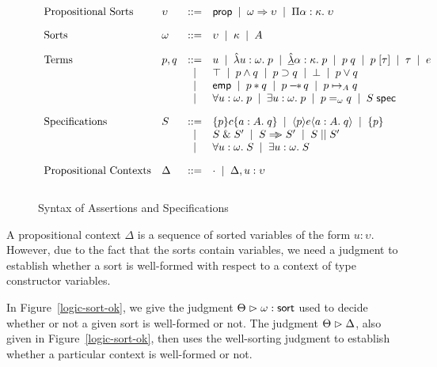 \begin{figure}
\begin{displaymath}
\begin{array}{llcl}
\mbox{Propositional Sorts} & 
\upsilon & ::= & \mathsf{prop} \;\;|\;\; \omega \Rightarrow \upsilon \;\;|\;\; \Pi {\alpha}:{\kappa}.\;{\upsilon}
\\[1em]
\mbox{Sorts} & \omega & ::= & \upsilon \;\;|\;\; \kappa \;\;|\;\; A 
\\[1em]

\mbox{Terms} & 
p,q & ::= & u \;\;|\;\; \hat{\lambda} u:\omega.\;p \;\;|\;\; \underline{\hat{\lambda}} \alpha:\kappa.\;p \;\;|\;\; p\;q \;\;|\;\; p\;[\tau] \;\;|\;\; \tau \;\;|\;\; e \\
&   &  |  & \top \;\;|\;\; p \land q \;\;|\;\; p \supset q \;\;|\;\; \bot \;\;|\;\; p \vee q \\
&   &  |  & \mathsf{emp} \;\;|\;\; p * q \;\;|\;\; p -\!\!*\, q \;\;|\;\; p \mapsto_{A} q \\
&   &  |  & \forall u:\omega.\; p \;\;|\;\; \exists u:\omega.\; p \;\;|\;\; p =_\omega q \;\;|\;\;
            {S}\;\mathsf{spec} \\[1em]

\mbox{Specifications} & 
S & ::= & \{{p}\}{c}\{{a:A}.\;{q}\} \;\;|\;\; \langle{p}\rangle{e}\langle{a:A}.\;{q}\rangle \;\;|\;\; \{{p}\} \\
& &  |  & S \;\&\; S' \;\;|\;\; S \Rightarrow\!\!\!> S' \;\;|\;\; S \;||\; S' \\
& &  |  & \forall u:\omega.\; S \;\;|\;\; \exists u:\omega.\; S \\[1em]

\mbox{Propositional Contexts} & 
\Delta & ::= & \cdot \;\;|\;\; \Delta, u:\upsilon \\[1em]
\end{array}
\end{displaymath}
\caption{Syntax of Assertions and Specifications}
\label{logic-syntax}  
\end{figure}



A propositional context $\Delta$ is a sequence of sorted variables of
the form $u:\upsilon$. However, due to the fact that the sorts contain
variables, we need a judgment to establish whether a sort is
well-formed with respect to a context of type constructor variables.

In Figure~\ref{logic-sort-ok}, we give the judgment
${{\Theta}} \vartriangleright {{\omega}} : {\mathsf{sort}}$ used to decide whether or not a given sort is
well-formed or not. The judgment ${\Theta} \vartriangleright {\Delta}$, also given in
Figure~\ref{logic-sort-ok}, then uses the well-sorting judgment to
establish whether a particular context is well-formed or not. 

